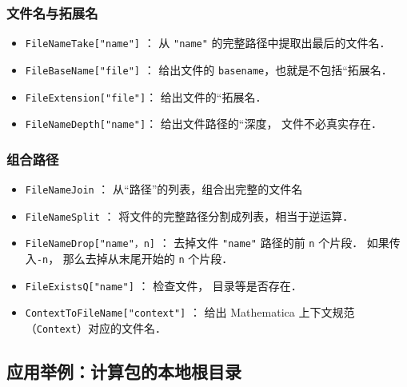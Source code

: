 \subsubsection{文件名与拓展名}

\begin{itemize}
\item \verb`FileNameTake["name"]` ： 从 \verb`"name"` 的完整路径中提取出最后的文件名．
\item \verb`FileBaseName["file"]` ： 给出文件的 \verb`basename`，也就是不包括“拓展名．
\item \verb`FileExtension["file"]`： 给出文件的“拓展名．
\item \verb`FileNameDepth["name"]`： 给出文件路径的“深度， 文件不必真实存在．
\end{itemize}

\subsubsection{组合路径}

\begin{itemize}
\item \verb`FileNameJoin` ： 从“路径”的列表，组合出完整的文件名
\item \verb`FileNameSplit` ： 将文件的完整路径分割成列表，相当于逆运算．
\item \verb`FileNameDrop["name"，n]` ： 去掉文件 \verb`"name"` 路径的前 \verb`n` 个片段． 
如果传入\verb`-n`， 那么去掉从末尾开始的 \verb`n` 个片段．
\item \verb`FileExistsQ["name"]`  ： 检查文件， 目录等是否存在．
\item \verb`ContextToFileName["context"]`  ： 给出 Mathematica 上下文规范（\verb`Context`）对应的文件名．
\end{itemize}

\subsection{应用举例：计算包的本地根目录}

